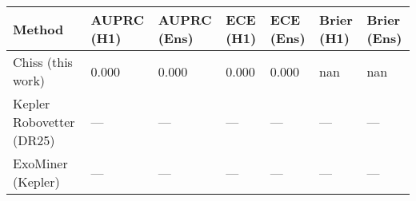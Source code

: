\begin{tabular}{lllllll}
\toprule
Method & AUPRC (H1) & AUPRC (Ens) & ECE (H1) & ECE (Ens) & Brier (H1) & Brier (Ens) \\
\midrule
Chiss (this work) & 0.000 & 0.000 & 0.000 & 0.000 & nan & nan \\
Kepler Robovetter (DR25) & — & — & — & — & — & — \\
ExoMiner (Kepler) & — & — & — & — & — & — \\
\bottomrule
\end{tabular}
